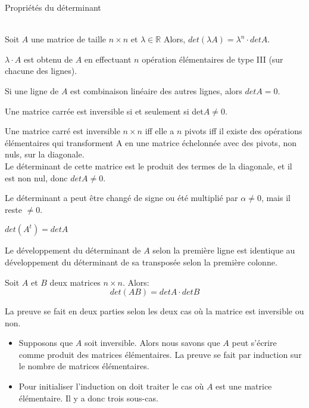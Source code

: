 \begin{parag}{Propriétés du déterminant}
    

\\

Soit $A$ une matrice de taille $n \times n$ et $\lambda \in \mathbb{R}$ Alors, $det (\lambda A) = \lambda^n \cdot det A $.
\begin{preuve}
    $\lambda \cdot A$ est obtenu de $A$ en effectuant $n$ opération élémentaires de type III (sur chacune des lignes).
    \end{preuve}
    \begin{framedremark}
        Si une ligne de $A$ est combinaison linéaire des autres lignes, alors $det A = 0$.
    \end{framedremark}
    \begin{theoreme}
        Une matrice carrée est inversible si et seulement si det$A \neq 0$.
    \end{theoreme}
    \begin{preuve}
        Une matrice carré est inversible $n\times n$ iff elle a $n$ pivots iff il existe des opérations élémentaires qui transforment A en une matrice échelonnée avec des pivots, non nuls, sur la diagonale.
        \\
        Le déterminant de cette matrice est le produit des termes de la diagonale, et il est non nul, donc $det A \neq 0$.
    \end{preuve}
    \begin{framedremark}
        Le déterminant a peut être changé de signe ou été multiplié par $\alpha \neq 0$, mais il reste $\neq 0$.
    \end{framedremark}
    
    \begin{theoreme}
        $det(A^t) = detA$
    \end{theoreme}
    \begin{preuve}
        Le développement du déterminant de $A$ selon la première ligne est identique au développement du déterminant de sa transposée selon la première colonne.
    \end{preuve}
    \begin{thm}
        Soit $A$ et $B$ deux matrices $n\times n$. Alors: 
        \\
        \[det(AB) = detA \cdot det B\]

    \end{thm}
    \begin{preuve}
        La preuve se fait en deux parties selon les deux cas où la matrice est inversible ou non.
        \begin{itemize}
            \item Supposons que $A$ soit inversible. Alors nous savons que $A$ peut s'écrire comme produit des matrices élémentaires. La preuve se fait par induction sur le nombre de matrices élémentaires.
            \item Pour initialiser l'induction on doit traiter le cas où $A$ est une matrice élémentaire. Il y a donc trois sous-cas.


\end{itemize}
\end{preuve}
\end{parag}
